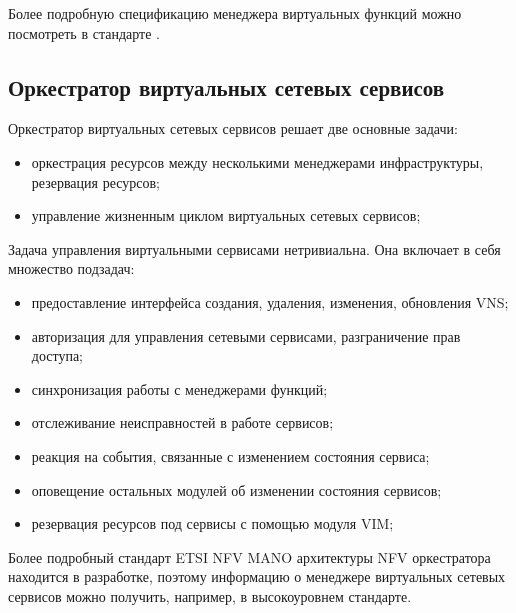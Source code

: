 \documentclass[oneside,final,14pt,a4paper]{extreport}
\begin{document}
Более подробную спецификацию менеджера виртуальных функций можно посмотреть в стандарте \cite{nfv-mano-official-2016-04}.

\subsection{Оркестратор виртуальных сетевых сервисов}
Оркестратор виртуальных сетевых сервисов решает две основные задачи:
\begin{itemize}
	\item оркестрация ресурсов между несколькими менеджерами инфраструктуры, резервация ресурсов;
	\item управление жизненным циклом виртуальных сетевых сервисов;
\end{itemize}

Задача управления виртуальными сервисами нетривиальна. Она включает в себя множество подзадач:

\begin{itemize}
	\item предоставление интерфейса создания, удаления, изменения, обновления VNS;
	\item авторизация для управления сетевыми сервисами, разграничение прав доступа;
	\item синхронизация работы с менеджерами функций;
	\item отслеживание неисправностей в работе сервисов;
	\item реакция на события, связанные с изменением состояния сервиса;
	\item оповещение остальных модулей об изменении состояния сервисов;
	\item резервация ресурсов под сервисы с помощью модуля VIM;
\end{itemize}

Более подробный стандарт ETSI NFV MANO архитектуры NFV оркестратора находится в разработке, поэтому информацию о менеджере виртуальных сетевых сервисов можно получить, например, в высокоуровнем стандарте.\cite{nfv-mano-official-2016-04}
\end{document}
